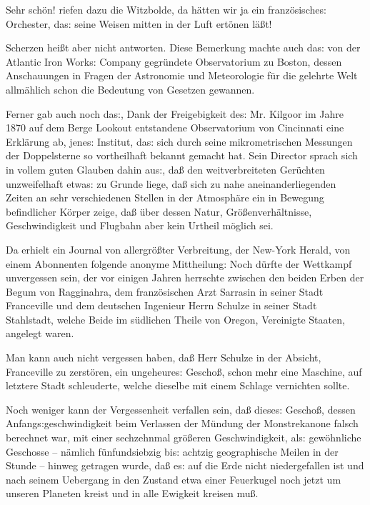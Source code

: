 \documentclass[oneside,12pt]{book}
\newcommand{\s}{s:}
\begin{document}
{\glqq}Sehr sch\"on! riefen dazu die Witzbolde, da h\"atten wir ja
ein franz\"osische{\s} Orchester, da{\s} seine Weisen mitten in der
Luft ert\"onen l\"a{\ss}t!{\grqq}

Scherzen hei{\ss}t aber nicht antworten. Diese Bemerkung machte auch
da{\s} von der Atlantic Iron Work{\s} Company gegr\"undete
Observatorium zu Boston, dessen Anschauungen in Fragen der Astronomie
und Meteorologie f\"ur die gelehrte Welt allm\"ahlich schon die
Bedeutung von Gesetzen gewannen.

Ferner gab auch noch da{\s}, Dank der Freigebigkeit de{\s} Mr.
Kilgoor im Jahre 1870 auf dem Berge Lookout entstandene Observatorium
von Cincinnati eine Erkl\"arung ab, jene{\s} Institut, da{\s} sich
durch seine mikrometrischen Messungen der Doppelsterne so
vortheilhaft bekannt gemacht hat. Sein Director sprach sich in vollem
guten Glauben dahin au{\s}, da{\ss} den weitverbreiteten Ger\"uchten
unzweifelhaft etwa{\s} zu Grunde liege, da{\ss} sich zu nahe
aneinanderliegenden Zeiten an sehr verschiedenen Stellen in der
Atmosph\"are ein in Bewegung befindlicher K\"orper zeige, da{\ss}
\"uber dessen Natur, Gr\"o{\ss}enverh\"altnisse, Geschwindigkeit und
Flugbahn aber kein Urtheil m\"oglich sei.

Da erhielt ein Journal von allergr\"o{\ss}ter Verbreitung, der
New-York Herald, von einem Abonnenten folgende anonyme Mittheilung:
{\glqq}Noch d\"urfte der Wettkampf unvergessen sein, der vor einigen
Jahren herrschte zwischen den beiden Erben der Begum von Ragginahra,
dem franz\"osischen Arzt Sarrasin in seiner Stadt Franceville und dem
deutschen Ingenieur Herrn Schulze in seiner Stadt Stahlstadt, welche
Beide im s\"udlichen Theile von Oregon, Vereinigte Staaten, angelegt
waren.

{\glqq}Man kann auch nicht vergessen haben, da{\ss} Herr Schulze in
der Absicht, Franceville zu zerst\"oren, ein ungeheure{\s}
Gescho{\ss}, schon mehr eine Maschine, auf letztere Stadt
schleuderte, welche dieselbe mit einem Schlage vernichten sollte.

{\glqq}Noch weniger kann der Vergessenheit verfallen sein, da{\ss}
diese{\s} Gescho{\ss}, dessen Anfang{\s}\-ge\-schwin\-dig\-keit
beim Verlassen der M\"undung der Monstrekanone falsch berechnet war,
mit einer sechzehnmal gr\"o{\ss}eren Geschwindigkeit, al{\s}
gew\"ohnliche Geschosse -- n\"amlich f\"unfundsiebzig bi{\s} acht\/zig
geographische Meilen in der Stunde -- hinweg getragen wurde, da{\ss}
e{\s} auf die Erde nicht niedergefallen ist und nach seinem Uebergang
in den Zustand etwa einer Feuerkugel noch jetzt um unseren Planeten
kreist und in alle Ewigkeit kreisen mu{\ss}.
\end{document}

